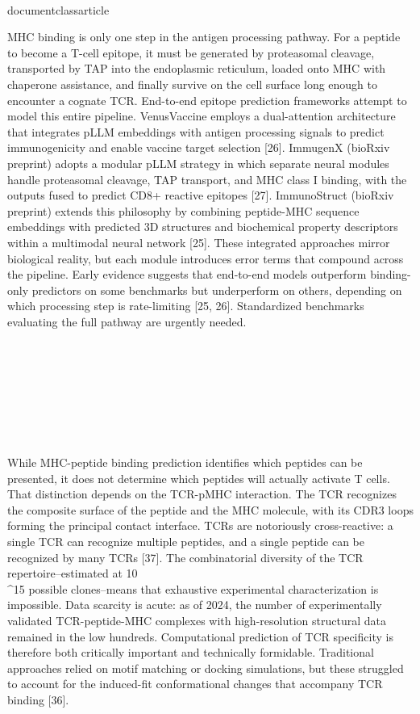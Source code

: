 \\documentclass{article}
\begin{document}
MHC binding is only one step in the antigen processing pathway. For a peptide to become a T-cell epitope, it must be generated by proteasomal cleavage, transported by TAP into the endoplasmic reticulum, loaded onto MHC with chaperone assistance, and finally survive on the cell surface long enough to encounter a cognate TCR. End-to-end epitope prediction frameworks attempt to model this entire pipeline. VenusVaccine employs a dual-attention architecture that integrates pLLM embeddings with antigen processing signals to predict immunogenicity and enable vaccine target selection [26]. ImmugenX (bioRxiv preprint) adopts a modular pLLM strategy in which separate neural modules handle proteasomal cleavage, TAP transport, and MHC class I binding, with the outputs fused to predict CD8+ reactive epitopes [27]. ImmunoStruct (bioRxiv preprint) extends this philosophy by combining peptide-MHC sequence embeddings with predicted 3D structures and biochemical property descriptors within a multimodal neural network [25]. These integrated approaches mirror biological reality, but each module introduces error terms that compound across the pipeline. Early evidence suggests that end-to-end models outperform binding-only predictors on some benchmarks but underperform on others, depending on which processing step is rate-limiting [25, 26]. Standardized benchmarks evaluating the full pathway are urgently needed.

\section{}

\subsection{}

While MHC-peptide binding prediction identifies which peptides can be presented, it does not determine which peptides will actually activate T cells. That distinction depends on the TCR-pMHC interaction. The TCR recognizes the composite surface of the peptide and the MHC molecule, with its CDR3 loops forming the principal contact interface. TCRs are notoriously cross-reactive: a single TCR can recognize multiple peptides, and a single peptide can be recognized by many TCRs [37]. The combinatorial diversity of the TCR repertoire--estimated at 10\\^15 possible clones--means that exhaustive experimental characterization is impossible. Data scarcity is acute: as of 2024, the number of experimentally validated TCR-peptide-MHC complexes with high-resolution structural data remained in the low hundreds. Computational prediction of TCR specificity is therefore both critically important and technically formidable. Traditional approaches relied on motif matching or docking simulations, but these struggled to account for the induced-fit conformational changes that accompany TCR binding [36].
\end{document}
